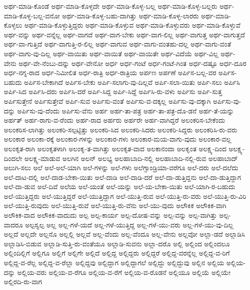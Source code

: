 {ಅರ್ಥ-ಮಾಡಿ-ಕೊಂಡೆ
ಅರ್ಥ-ಮಾಡಿ-ಕೊಳ್ಳದೇ
ಅರ್ಥ-ಮಾಡಿ-ಕೊಳ್ಳ-ಬಲ್ಲ
ಅರ್ಥ-ಮಾಡಿ-ಕೊಳ್ಳ-ಬಲ್ಲರು
ಅರ್ಥ-ಮಾಡಿ-ಕೊಳ್ಳ-ಬಲ್ಲ-ವನೋ
ಅರ್ಥ-ಮಾಡಿ-ಕೊಳ್ಳ-ಬಹು-ದಾಗಿತ್ತು
ಅರ್ಥ-ಮಾಡಿ-ಕೊಳ್ಳ-ಲಾರರು
ಅರ್ಥ-ಮಾಡಿ-ಕೊಳ್ಳಲು
ಅರ್ಥ-ಮಾಡಿ-ಕೊಳ್ಳುತ್ತಿದ್ದರು
ಅರ್ಥ-ಮಾಡಿ-ಕೊಳ್ಳುವ
ಅರ್ಥ-ಮಾಡಿ-ಕೊಳ್ಳುವರು
ಅರ್ಥ-ಮಾಡಿ-ಕೊಳ್ಳುವೆ
ಅರ್ಥ-ವನ್ನು
ಅರ್ಥ-ವನ್ನೆಲ್ಲ
ಅರ್ಥ-ವಾಗದೆ
ಅರ್ಥ-ವಾಗ-ಬೇಕು
ಅರ್ಥ-ವಾಗ-ಲಿಲ್ಲ
ಅರ್ಥ-ವಾಗುತ್ತ
ಅರ್ಥ-ವಾಗುತ್ತದೆ
ಅರ್ಥ-ವಾ-ಗುತ್ತಿದೆ
ಅರ್ಥ-ವಾಗುತ್ತಿ-ರ-ಲಿಲ್ಲ
ಅರ್ಥ-ವಾಗುವ
ಅರ್ಥ-ವಾಗು-ವಂತಹು-ದಲ್ಲ
ಅರ್ಥ-ವಾಗು-ವಂತೆ
ಅರ್ಥ-ವಾಗು-ವು-ದಿಲ್ಲ
ಅರ್ಥ-ವಾಯಿತು
ಅರ್ಥ-ವಾಯಿತೆ
ಅರ್ಥ-ವಾಯಿತೇ
ಅರ್ಥ-ವಿದೆಯೆ
ಅರ್ಥ-ವಿಲ್ಲ
ಅರ್ಥ-ವೇನು
ಅರ್ಥ-ವೇ-ನೆಂಬು-ದನ್ನು
ಅರ್ಥ-ವೇನೋ
ಅರ್ಧ
ಅರ್ಧ-ಗಂಟೆ
ಅರ್ಧ-ಗಂಟೆ-ಗಿಂತ
ಅರ್ಧ-ದಷ್ಟೂ
ಅರ್ಧ-ದೂರ
ಅರ್ಧ-ನಗ್ನ-ರಾದ
ಅರ್ಧ-ನಿಮೀಲಿತ
ಅರ್ಧ-ರಾತ್ರಿ
ಅರ್ಧ-ರಾತ್ರಿಯ
ಅರ್ಪಣ
ಅರ್ಪಣೆ
ಅರ್ಪಿಸ-ಬಲ್ಲ-ವರ
ಅರ್ಪಿಸ-ಬಹುದು
ಅರ್ಪಿಸ-ಬೇಕಾಗಿದೆ
ಅರ್ಪಿಸ-ಬೇಕು
ಅರ್ಪಿ-ಸಲಾಗು-ವು-ದಿಲ್ಲವೆ
ಅರ್ಪಿ-ಸಲಾ-ಯಿತು
ಅರ್ಪಿ-ಸಲು
ಅರ್ಪಿಸಿ
ಅರ್ಪಿ-ಸಿದ
ಅರ್ಪಿಸಿ-ದರು
ಅರ್ಪಿಸಿ-ದರೆ
ಅರ್ಪಿ-ಸಿದ್ದ
ಅರ್ಪಿ-ಸಿದ್ದೆ
ಅರ್ಪಿಸಿ-ರು-ವಳು
ಅರ್ಪಿಸು
ಅರ್ಪಿ-ಸುತ್ತ
ಅರ್ಪಿಸುತ್ತೇನೆ
ಅರ್ಪಿಸುತ್ತೇವೆ
ಅರ್ಪಿ-ಸುವ
ಅರ್ಪಿಸು-ವಂತೆ
ಅರ್ಪಿಸು-ವ-ದಕ್ಕಲ್ಲ
ಅರ್ಪಿಸು-ವು-ದಕ್ಕಾಗಿ
ಅರ್ಪಿಸು-ವು-ದನ್ನು
ಅರ್ಪಿಸು-ವು-ದೆಂದು
ಅರ್ಪಿಸು-ವೆನು
ಅರ್ಹ
ಅರ್ಹ-ತಾ-ಪತ್ರ
ಅರ್ಹ-ತಾ-ಪತ್ರ-ದೊ-ಡನೆ
ಅರ್ಹ-ತೆ-ಯನ್ನು
ಅರ್ಹತ್
ಅರ್ಹ-ರಾಗು-ವ-ರೆಂದು
ಅರ್ಹ-ರಾದ
ಅರ್ಹರು
ಅರ್ಹರೇ
ಅರ್ಹ-ವಾಗಿದ್ದರೆ
ಅಲಂಕರಿಸ-ಬೇಕೆಂದು
ಅಲಂಕರಿಸ-ಲಾಗಿತ್ತು
ಅಲಂಕರಿ-ಸಲ್ಪಟ್ಟಿತ್ತು
ಅಲಂಕರಿ-ಸಿದ
ಅಲಂಕರಿ-ಸಿದರು
ಅಲಂಕರಿ-ಸಿದ್ದರು
ಅಲಂಕರಿಸಿ-ರು-ವರು
ಅಲಂಕಾರ
ಅಲಂಕಾ-ರಕ್ಕೆ
ಅಲಂಕಾರ-ಗಳನ್ನು
ಅಲಂಕಾರ-ಗಳು
ಅಲಂಕಾರ-ಮಯ-ವಾಗು-ವುದು
ಅಲಂಕಾರ-ವಲ್ಲ
ಅಲಂಕೃತ-ರಾಗಿ
ಅಲಂಕೃತಳಾಗಿ
ಅಲಂಕೃ-ತ-ವಾಗಿತ್ತು
ಅಲಂಕೃತ-ವಾದ
ಅಲಕಾನಂದಾ
ಅಲಕೃಂತ
ಅಲಕ್ಷ್ಯ-ದಿಂದ
ಅಲಕ್ಷ್ಯ-ದಿಂದಲೇ
ಅಲಕ್ಷ್ಯ-ಮಾಡುವ
ಅಲಗಿನ
ಅಲನ್
ಅಲಭ್ಯ
ಅಲಹಾಬಾದಿ-ನಲ್ಲಿ
ಅಲಹಾಬಾದಿ-ನಲ್ಲಿ-ರುವ
ಅಲಹಾಬಾದ್
ಅಲುಗಿ-ಸಲು
ಅಲೆ
ಅಲೆ-ಅಲೆ-ಯಾಗಿ
ಅಲೆ-ಗಳನ್ನು
ಅಲೆ-ಗಳು
ಅಲೆಗ್ಸಾಂಡ್ರಿಯಾ-ವರೆಗೂ
ಅಲೆ-ದರು
ಅಲೆ-ದಲೆದು
ಅಲೆ-ದಾಟ-ದಲ್ಲಿ
ಅಲೆ-ದಾಡ-ಬೇಕಾ-ಯಿತು
ಅಲೆ-ದಾಡಿ
ಅಲೆ-ದಾಡಿ-ದರೆ
ಅಲೆ-ದಾ-ಡುತ್ತಿದ್ದನು
ಅಲೆ-ದಾ-ಡುತ್ತಿದ್ದಾಗ
ಅಲೆ-ದಾ-ಡುವ
ಅಲೆ-ದಿವೆ
ಅಲೆಯ
ಅಲೆ-ಯಂತೆ
ಅಲೆ-ಯನ್ನು
ಅಲೆ-ಯ-ಬೇಕಾ-ಯಿತು
ಅಲೆ-ಯಾಗಿ-ರ-ಬಹುದು
ಅಲೆ-ಯುತ್ತಿದ್ದರು
ಅಲೆ-ಯುತ್ತಿದ್ದರೆ
ಅಲೆ-ಯುತ್ತಿದ್ದಾಗ
ಅಲೆ-ಯುತ್ತಿ-ರುವ
ಅಲೆ-ಯುತ್ತಿ-ರು-ವರು
ಅಲೆ-ಯುತ್ತಿ-ರು-ವಿರಿ
ಅಲೆ-ಯುತ್ತಿ-ರುವುದು
ಅಲೆ-ಯುತ್ತಿ-ರುವೆ
ಅಲೆ-ಯುತ್ತಿ-ರು-ವೆನು
ಅಲೆ-ಯು-ವುದು
ಅಲೌಕಿಕ
ಅಲೌಕಿಕ-ವಾಗಿ
ಅಲೌಕಿಕ-ವಾದ
ಅಲೌಕಿಕ-ವಾದುದು
ಅಲ್ಪ
ಅಲ್ಪ-ಕಾರ್ಯ
ಅಲ್ಪ-ದೋಷ-ವನ್ನು
ಅಲ್ಪ-ವನ್ನು
ಅಲ್ಪ-ವಾಗಿತ್ತು
ಅಲ್ಪ-ವಾದರೂ
ಅಲ್ಪಸ್ವಲ್ಪ
ಅಲ್ಲ
ಅಲ್ಲ-ಗಳೆ-ಯದೆ
ಅಲ್ಲ-ಗಳೆ-ಯುತ್ತಿದ್ದ
ಅಲ್ಲ-ಗಳೆ-ಯು-ವರು
ಅಲ್ಲ-ಗಳೆ-ಯು-ವು-ದಿಲ್ಲ
ಅಲ್ಲದೆ
ಅಲ್ಲದೇ
ಅಲ್ಲನೊ
ಅಲ್ಲಲ್ಲಿ
ಅಲ್ಲವೆ
ಅಲ್ಲ-ವೆಂದು
ಅಲ್ಲ-ವೆಂದೂ
ಅಲ್ಲ-ವೇನು
ಅಲ್ಲವೋ
ಅಲ್ಲಾ-ಡದೆ
ಅಲ್ಲಾಡಿಸಿ
ಅಲ್ಲಾಡಿಸಿ-ಬಿಡುವ
ಅಲ್ಲಾಡಿ-ಸುತ್ತಿ-ರು-ವಂತೆಯೂ
ಅಲ್ಲಾಡಿ-ಸುವನು
ಅಲ್ಲಾ-ದರೊ
ಅಲ್ಲಿ
ಅಲ್ಲಿಂದ
ಅಲ್ಲಿಂದಲೂ
ಅಲ್ಲಿಂದಿಲ್ಲಿಗೆ
ಅಲ್ಲಿಗೂ
ಅಲ್ಲಿಗೆ
ಅಲ್ಲಿಗೇ
ಅಲ್ಲಿದೆ
ಅಲ್ಲಿದ್ದ
ಅಲ್ಲಿದ್ದರು
ಅಲ್ಲಿದ್ದರೆ
ಅಲ್ಲಿದ್ದ-ವರನ್ನೆಲ್ಲ
ಅಲ್ಲಿದ್ದ-ವ-ರಿಗೆ
ಅಲ್ಲಿದ್ದ-ವ-ರೆಲ್ಲ
ಅಲ್ಲಿದ್ದ-ವ-ರೆಲ್ಲಾ
ಅಲ್ಲಿದ್ದವು
ಅಲ್ಲಿದ್ದಾಗ
ಅಲ್ಲಿದ್ದಾಗಲೆ
ಅಲ್ಲಿದ್ದು
ಅಲ್ಲಿದ್ದುವು
ಅಲ್ಲಿನ
ಅಲ್ಲಿಯ
ಅಲ್ಲಿಯ-ದನ್ನು
ಅಲ್ಲಿಯ-ವರು
ಅಲ್ಲಿಯ-ವ-ರೆಗೂ
ಅಲ್ಲಿಯ-ವ-ರೆಗೆ
ಅಲ್ಲಿಯ-ವ-ರೊಡನೆ
ಅಲ್ಲಿಯೂ
ಅಲ್ಲಿಯೆ
ಅಲ್ಲಿಯೇ
ಅಲ್ಲಿರದಿ-ರು-ವಾಗ
}
